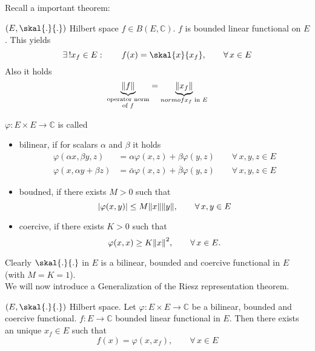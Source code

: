 Recall a important theorem:

\begin{theorem}
	$(E, \skal{.}{.})$ Hilbert space $f \in B(E,\mathbb{C})$. $f$ is bounded linear functional on $E$. This yields
	\[
		\exists\,! x_f \in E: \qquad f(x) = \skal{x}{x_f}, \qquad \forall\, x \in E
	\]
	Also it holds
	\[
		\underset{\substack{\text{operator norm} \\ \text{of $f$}}}{\underbrace{\norm{f}}} = \underset{\substack{norm of} \\ \text{$x_f$ in $E$}}{\underbrace{\norm{x_f}}}
	\]
\end{theorem}

\begin{definition}
	$\varphi: E \times E \to \mathbb{C}$ is called
	\begin{itemize}
		\item bilinear, if for scalars $\alpha$ and $\beta$ it holds
		\begin{align*}
			\varphi( \alpha x, \beta y,z) &= \alpha \varphi(x,z)+ \beta \varphi(y,z) \qquad \forall\, x,y,z \in E \\
			\varphi(x,\alpha y + \beta z) &= \bar{\alpha} \varphi(x,z) + \overline{\beta} \varphi(y,z) \qquad \forall\, x,y,z \in E
		\end{align*}
		\item boudned, if there exists $M>0$ such that
		\[
			\abs{\varphi(x,y)} \leq M \norm{x}\norm{y}, \qquad \forall\, x,y \in E
		\]
		\item coercive, if there exists $K>0$ such that
		\[
			\varphi(x,x) \geq K \norm{x}^2, \qquad \forall\, x \in E.
		\]
	\end{itemize}
\end{definition}
Clearly $\skal{.}{.}$ in $E$ is a bilinear, bounded and coercive functional in $E$ (with $M=K=1$). \\
We will now introduce a Generalization of the Riesz representation theorem.

\begin{theorem}
	$(E, \skal{.}{.})$ Hilbert space. Let $\varphi: E \times E \to \mathbb{C}$ be a bilinear, bounded and coercive functional. $f: E \to \mathbb{C}$ bounded linear functional in $E$. Then there exists an unique $x_f \in E$ such that
	\[
		f(x) = \varphi(x,x_f), \qquad  \forall\, x \in E
	\]
\end{theorem}

